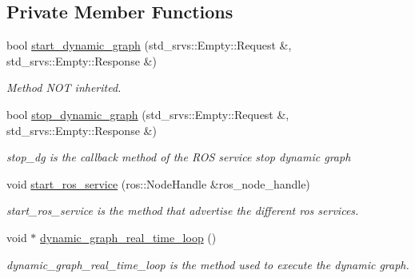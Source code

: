 \subsection*{Private Member Functions}
\begin{DoxyCompactItemize}
\item 
bool \hyperlink{classdynamic__graph_1_1DynamicGraphManager_a664c7a3810c13a33057ae060281966b1}{start\+\_\+dynamic\+\_\+graph} (std\+\_\+srvs\+::\+Empty\+::\+Request \&, std\+\_\+srvs\+::\+Empty\+::\+Response \&)
\begin{DoxyCompactList}\small\item\em Method N\+OT inherited. \end{DoxyCompactList}\item 
bool \hyperlink{classdynamic__graph_1_1DynamicGraphManager_a06740416640f3464edbbb57ee759b8fb}{stop\+\_\+dynamic\+\_\+graph} (std\+\_\+srvs\+::\+Empty\+::\+Request \&, std\+\_\+srvs\+::\+Empty\+::\+Response \&)
\begin{DoxyCompactList}\small\item\em stop\+\_\+dg is the callback method of the R\+OS service stop dynamic graph \end{DoxyCompactList}\item 
\mbox{\label{classdynamic__graph_1_1DynamicGraphManager_aa396c4c91c076a103e2d5cb6c5606a7d}} 
void \hyperlink{classdynamic__graph_1_1DynamicGraphManager_aa396c4c91c076a103e2d5cb6c5606a7d}{start\+\_\+ros\+\_\+service} (ros\+::\+Node\+Handle \&ros\+\_\+node\+\_\+handle)
\begin{DoxyCompactList}\small\item\em start\+\_\+ros\+\_\+service is the method that advertise the different ros services. \end{DoxyCompactList}\item 
\mbox{\label{classdynamic__graph_1_1DynamicGraphManager_a72f9e755719ec8fde8f145a67b518333}} 
void $\ast$ \hyperlink{classdynamic__graph_1_1DynamicGraphManager_a72f9e755719ec8fde8f145a67b518333}{dynamic\+\_\+graph\+\_\+real\+\_\+time\+\_\+loop} ()
\begin{DoxyCompactList}\small\item\em dynamic\+\_\+graph\+\_\+real\+\_\+time\+\_\+loop is the method used to execute the dynamic graph. \end{DoxyCompactList}\item 

\end{DoxyCompactItemize}
